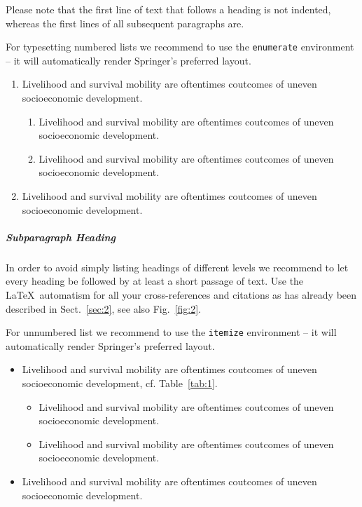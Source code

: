 \documentclass[graybox]{svmult}
\begin{document}
Please note that the first line of text that follows a heading is not indented, whereas the first lines of all subsequent paragraphs are.

For typesetting numbered lists we recommend to use the \verb|enumerate| environment -- it will automatically render Springer's preferred layout.

\begin{enumerate}
\item{Livelihood and survival mobility are oftentimes coutcomes of uneven socioeconomic development.}
\begin{enumerate}
\item{Livelihood and survival mobility are oftentimes coutcomes of uneven socioeconomic development.}
\item{Livelihood and survival mobility are oftentimes coutcomes of uneven socioeconomic development.}
\end{enumerate}
\item{Livelihood and survival mobility are oftentimes coutcomes of uneven socioeconomic development.}
\end{enumerate}


\subparagraph{Subparagraph Heading} In order to avoid simply listing headings of different levels we recommend to let every heading be followed by at least a short passage of text. Use the \LaTeX\ automatism for all your cross-references and citations as has already been described in Sect.~\ref{sec:2}, see also Fig.~\ref{fig:2}.

For unnumbered list we recommend to use the \verb|itemize| environment -- it will automatically render Springer's preferred layout.

\begin{itemize}
\item{Livelihood and survival mobility are oftentimes coutcomes of uneven socioeconomic development, cf. Table~\ref{tab:1}.}
\begin{itemize}
\item{Livelihood and survival mobility are oftentimes coutcomes of uneven socioeconomic development.}
\item{Livelihood and survival mobility are oftentimes coutcomes of uneven socioeconomic development.}
\end{itemize}
\item{Livelihood and survival mobility are oftentimes coutcomes of uneven socioeconomic development.}
\end{itemize}
\end{document}
